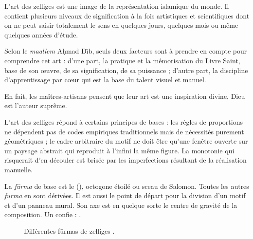 L'art des zelliges est une image de la représentation islamique 
du monde. Il contient plusieurs niveaux de signification à la fois 
artistiques et scientifiques dont on ne peut saisir totalement le 
sens en quelques jours, quelques mois ou même quelques années d'étude.

Selon le \emph{maallem} A\d{h}mad D\={\i}b, seuls deux facteurs sont 
à prendre en compte pour comprendre cet art : d'une part, la pratique 
et la mémorisation du Livre Saint, base de son {\oe}uvre, de sa 
signification, de sa puissance ; d'autre part, la discipline 
d'apprentissage par c{\oe}ur qui est la base du talent visuel et 
manuel.

En fait, les maîtres-artisans pensent que leur art est une inspiration 
divine, Dieu est l'auteur suprême.

L'art des zelliges répond à certains principes de bases : les règles 
de proportions ne dépendent pas de codes empiriques traditionnels mais 
de nécessités purement géométriques ; le cadre arbitraire du motif ne 
doit être qu'une fenêtre ouverte sur un paysage abstrait qui reproduit 
à l'infini la même figure. La monotonie qui risquerait d'en découler 
est brisée par les imperfections résultant de la réalisation manuelle.

La \emph{f\={u}rma} de base est le \hatim (), 
octogone étoilé ou sceau de Salomon. Toutes les autres 
\emph{f\={u}rma} en sont dérivées. Il est aussi le point de départ 
pour la division d'un motif et d'un panneau mural. Son axe est en 
quelque sorte le centre de gravité de la composition. Un \zlaygi 
confie :  
\autocite{Castera_1996}.

\begin{figure}[htb]
  \caption{Différentes f\={u}rmas de zelliges \autocite{Castera_1996}.}
  \label{fig:furmas}
\end{figure}

